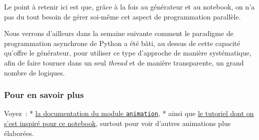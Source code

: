 Le point à retenir ici est que, grâce à la fois au générateur et au
notebook, on n'a pas du tout besoin de gérer soi-même cet aspect de
programmation parallèle.

Nous verrons d'ailleurs dans la semaine suivante comment le paradigme de
programmation asynchrone de Python a été bâti, au dessus de cette
capacité qu'offre le générateur, pour utiliser ce type d'approche de
manière systématique, afin de faire tourner dans un seul \emph{thread}
et de manière transparente, un grand nombre de logiques.

    \hypertarget{pour-en-savoir-plus}{%
\subsubsection{Pour en savoir plus}\label{pour-en-savoir-plus}}

Voyez~: * \href{https://matplotlib.org/api/animation_api.html}{la
documentation du module \texttt{animation}}, * ainsi que
\href{https://jakevdp.github.io/blog/2012/08/18/matplotlib-animation-tutorial/}{le
tutoriel dont on s'est inspiré pour ce notebook}, surtout pour voir
d'autres animations plus élaborées.


    
    
    
